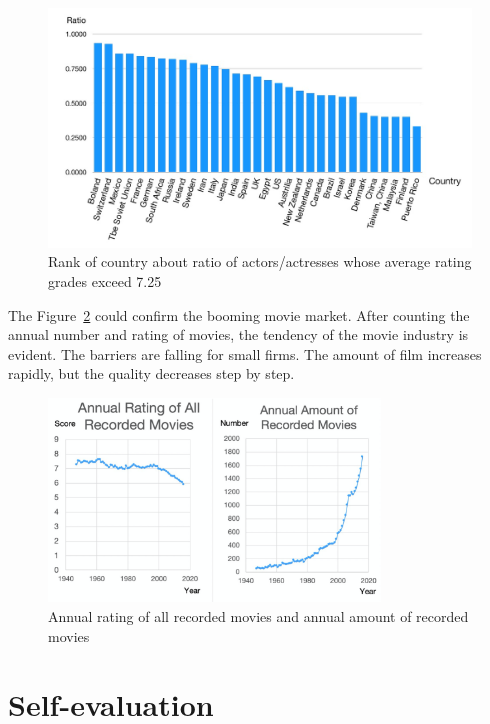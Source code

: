 \documentclass[a4paper]{article}
\begin{document}
\begin{figure}[H]
  \centering
  \includegraphics[width=320pt]{figures/rank.jpeg}
  \caption{Rank of country about ratio of actors/actresses whose average rating grades exceed 7.25}
  \label{fig:rank}
\end{figure}
The Figure~\ref{fig:annual} could confirm the booming movie market. After counting the annual number and rating of movies, the tendency of the movie industry is evident. The barriers are falling for small firms. The amount of film increases rapidly, but the quality decreases step by step.

\begin{figure}[H]
  \centering
  \includegraphics[width=250pt]{figures/annual.png}
  \caption{Annual rating of all recorded movies and annual amount of recorded movies}
  \label{fig:annual}
\end{figure}

\section{Self-evaluation}
\end{document}
